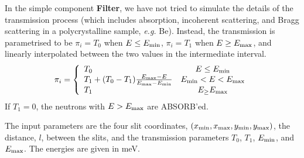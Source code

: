 In the simple component {\bf Filter},
we have not tried to simulate the details of the transmission
process (which includes absorption, incoherent scattering,
and Bragg scattering in a polycrystalline sample, {\em e.g.} Be).
Instead, the transmission is parametrised to be
$\pi_i=T_0$ when $E \leq E_{\rm min}$, $\pi_i=T_1$ when $E \geq E_{\rm max}$,
and linearly interpolated between the two values
in the intermediate interval.
\begin{equation}
\pi_i = \left\{ \begin{array}{lc}
 T_0  & E \leq E_{\rm min} \\
 T_1 + (T_0-T_1) \frac{E_{\rm max}-E}{E_{\rm max}-E_{\rm min}}
 & E_{\rm min} < E < E_{\rm max} \\
 T_1  & E_\geq E_{\rm max} \\
\end{array} \right.
\end{equation}
If $T_1=0$, the neutrons with $E>E_{\rm max}$ are ABSORB'ed.

The input parameters are the four slit coordinates, 
$(x_{\rm min}, x_{\rm max}, y_{\rm min}, y_{\rm max})$,
the distance, $l$, between the slits, and the transmission parameters 
$T_0$, $T_1$, $E_{\rm min}$, and $E_{\rm max}$. 
The energies are given in meV.
